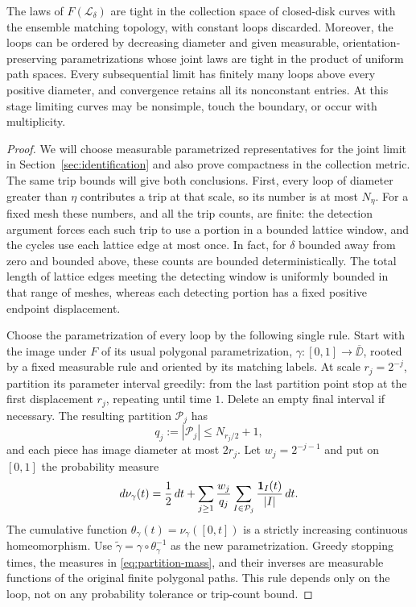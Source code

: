 \begin{proposition}
\label{prop:tightness}
The laws of $F(\mathcal L_\delta)$ are tight in the collection space of
closed-disk curves with the ensemble matching topology, with constant
loops discarded.  Moreover, the loops can be ordered by decreasing
diameter and given measurable, orientation-preserving parametrizations
whose joint laws are tight in the product of uniform path spaces.
Every subsequential limit has finitely many loops above every positive
diameter, and convergence retains all its nonconstant entries.
At this stage limiting curves may be nonsimple, touch the boundary,
or occur with multiplicity.
\end{proposition}

\begin{proof}
We will choose measurable parametrized representatives for the joint
limit in Section~\ref{sec:identification} and also prove compactness in
the collection metric. The same trip bounds will give both conclusions.
First, every loop of diameter greater than $\eta$ contributes a trip
at that scale, so its number is at most $N_\eta$.
For a fixed mesh these numbers, and all the trip counts, are finite:
the detection argument forces each such trip to use a portion in a
bounded lattice window, and the cycles use each lattice edge at most
once.  In fact, for $\delta$ bounded away from zero and bounded above,
these counts are bounded deterministically.  The total length of
lattice edges meeting the detecting window is uniformly bounded in
that range of meshes, whereas each detecting portion has a fixed
positive endpoint displacement.

Choose the parametrization of every loop by the following single rule.
Start with the image under $F$
of its usual polygonal parametrization,
$\gamma:[0,1]\to\overline{\DD}$, rooted by a fixed measurable rule and
oriented by its matching labels.  At scale
$r_j=2^{-j}$, partition its parameter interval greedily: from the last
partition point stop at the first displacement $r_j$, repeating until
time $1$.  Delete an empty final interval if necessary.  The resulting
partition $\mathcal P_j$ has
\[
 q_j:=|\mathcal P_j|\le N_{r_j/2}+1,
\]
and each piece has image diameter at most $2r_j$.
Let $w_j=2^{-j-1}$ and put on $[0,1]$ the probability measure
\begin{equation}
 d\nu_\gamma(t)=\frac12\,dt+
 \sum_{j\ge1}\frac{w_j}{q_j}
       \sum_{I\in\mathcal P_j}\frac{\mathbf 1_I(t)}{|I|}\,dt.
 \label{eq:partition-mass}
\end{equation}
The cumulative function $\theta_\gamma(t)=\nu_\gamma([0,t])$ is a
strictly increasing continuous homeomorphism.  Use
$\widetilde\gamma=\gamma\circ\theta_\gamma^{-1}$ as the new
parametrization. Greedy stopping times, the measures in
\eqref{eq:partition-mass}, and their inverses are measurable functions
of the original finite polygonal paths. This rule depends only on the
loop, not on any probability tolerance or trip-count bound.


\end{proof}
